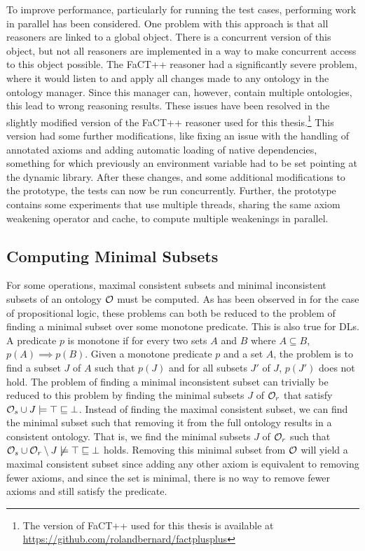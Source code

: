 To improve performance, particularly for running the test cases, performing work in parallel has been considered. One problem with this approach is that all reasoners are linked to a global  object. There is a concurrent version of this object, but not all reasoners are implemented in a way to make concurrent access to this object possible. The FaCT++ reasoner \cite{factpp} had a significantly severe problem, where it would listen to and apply all changes made to any ontology in the ontology manager. Since this manager can, however, contain multiple ontologies, this lead to wrong reasoning results. These issues have been resolved in the slightly modified version of the FaCT++ reasoner used for this thesis.\footnote{The version of FaCT++ used for this thesis is available at \url{https://github.com/rolandbernard/factplusplus}} This version had some further modifications, like fixing an issue with the handling of annotated axioms and adding automatic loading of native dependencies, something for which previously an environment variable had to be set pointing at the dynamic library. After these changes, and some additional modifications to the prototype, the tests can now be run concurrently. Further, the prototype contains some experiments that use multiple threads, sharing the same axiom weakening operator and cache, to compute multiple weakenings in parallel.

\subsection{Computing Minimal Subsets}\label{minimal-set-impl}

For some operations, maximal consistent subsets and minimal inconsistent subsets of an ontology $\mathcal{O}$ must be computed. As has been observed in \cite{marques2013minimal} for the case of propositional logic, these problems can both be reduced to the problem of finding a minimal subset over some monotone predicate. This is also true for DLs. A predicate $p$ is monotone if for every two sets $A$ and $B$ where $A \subseteq B$, $p(A) \implies p(B)$. Given a monotone predicate $p$ and a set $A$, the problem is to find a subset $J$ of $A$ such that $p(J)$ and for all subsets $J'$ of $J$, $p(J')$ does not hold. The problem of finding a minimal inconsistent subset can trivially be reduced to this problem by finding the minimal subsets $J$ of $\mathcal{O}_r$ that satisfy $\mathcal{O}_s \cup J \models \top \sqsubseteq \bot$. Instead of finding the maximal consistent subset, we can find the minimal subset such that removing it from the full ontology results in a consistent ontology. That is, we find the minimal subsets $J$ of $\mathcal{O}_r$ such that $\mathcal{O}_s \cup \mathcal{O}_r \setminus J \not\models \top \sqsubseteq \bot$ holds. Removing this minimal subset from $\mathcal{O}$ will yield a maximal consistent subset since adding any other axiom is equivalent to removing fewer axioms, and since the set is minimal, there is no way to remove fewer axioms and still satisfy the predicate.

